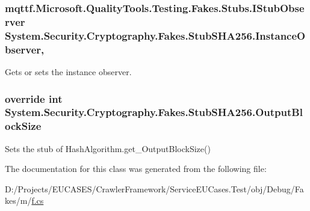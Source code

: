 \hypertarget{class_system_1_1_security_1_1_cryptography_1_1_fakes_1_1_stub_s_h_a256_a7dc6009fa3ed787034cb9178f372aefe}{
\subsubsection[{Instance\-Observer}]{\setlength{\rightskip}{0pt plus 5cm}mqttf.\-Microsoft.\-Quality\-Tools.\-Testing.\-Fakes.\-Stubs.\-I\-Stub\-Observer System.\-Security.\-Cryptography.\-Fakes.\-Stub\-S\-H\-A256.\-Instance\-Observer\hspace{0.3cm}{\ttfamily [get]}, {\ttfamily [set]}}}\label{class_system_1_1_security_1_1_cryptography_1_1_fakes_1_1_stub_s_h_a256_a7dc6009fa3ed787034cb9178f372aefe}


Gets or sets the instance observer.

\hypertarget{class_system_1_1_security_1_1_cryptography_1_1_fakes_1_1_stub_s_h_a256_ae070269c431baf285cb2e18a379c166a}{
\subsubsection[{Output\-Block\-Size}]{\setlength{\rightskip}{0pt plus 5cm}override int System.\-Security.\-Cryptography.\-Fakes.\-Stub\-S\-H\-A256.\-Output\-Block\-Size\hspace{0.3cm}{\ttfamily [get]}}}\label{class_system_1_1_security_1_1_cryptography_1_1_fakes_1_1_stub_s_h_a256_ae070269c431baf285cb2e18a379c166a}


Sets the stub of Hash\-Algorithm.\-get\-\_\-\-Output\-Block\-Size()



The documentation for this class was generated from the following file\-:\begin{DoxyCompactItemize}
\item 
D\-:/\-Projects/\-E\-U\-C\-A\-S\-E\-S/\-Crawler\-Framework/\-Service\-E\-U\-Cases.\-Test/obj/\-Debug/\-Fakes/m/\hyperlink{m_2f_8cs}{f.\-cs}\end{DoxyCompactItemize}
